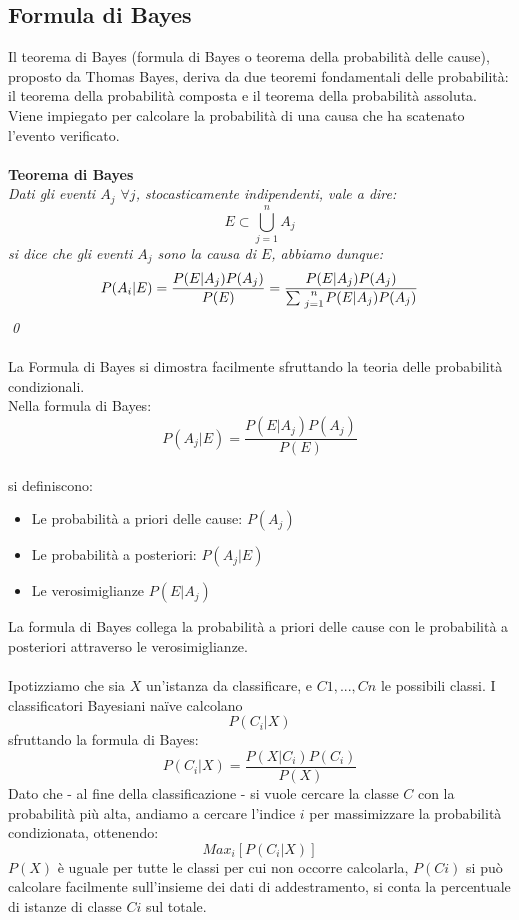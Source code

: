 \documentclass{article}
\theoremstyle{plain}
\theoremstyle{definition}
\begin{document}
\subsection{Formula di Bayes}
Il teorema di Bayes (formula di Bayes o teorema della probabilità delle cause), proposto da Thomas Bayes, deriva da due teoremi fondamentali delle probabilità: il teorema della probabilità composta e il teorema della probabilità assoluta. Viene impiegato per calcolare la probabilità di una causa che ha scatenato l'evento verificato.
\\
\\
\textbf{Teorema di Bayes}
\\
\textit{
Dati gli eventi $A_j$ $\forall j$, stocasticamente indipendenti, vale a dire:
$$E \subset \bigcup\limits_{j=1}^{n} A_j $$
si dice che gli eventi $A_j$ sono la causa di $E$,  abbiamo dunque:
$$
P(A_{i}|E)={\frac  {P(E|A_{j})P(A_{j})}{P(E)}}={\frac  {P(E|A_{j})P(A_{j})}{\sum {n \atop j=1}P(E|A_{j})P(A_{j})}}$$
\qed
}
\\
\\
La Formula di Bayes si dimostra facilmente sfruttando la teoria delle probabilità condizionali. 
\footnotemark
{}
\\
Nella formula di Bayes:
$$P(A_{j}|E)={\frac  {P(E|A_{j})P(A_{j})}{P(E)}}$$
\\
si definiscono:
\begin{itemize}
\item Le probabilità a priori delle cause: $P(A_j)$
\item Le probabilità a posteriori: $P(A_j|E)$
\item Le verosimiglianze $P(E|A_{j})$
\end{itemize} 
La formula di Bayes collega la probabilità a priori delle cause con le probabilità a posteriori attraverso le verosimiglianze.
\\
\\
Ipotizziamo che sia $X$ un'istanza da classificare, e $C1,...,Cn$ le possibili classi. I classificatori Bayesiani naïve calcolano $$P(C_i|X)$$ sfruttando la formula di Bayes: $$P(C_i|X)=\frac{P(X|C_i)P(C_i)}{P(X)}$$
Dato che - al fine della classificazione - si vuole cercare la classe $C$ con la probabilità più alta, andiamo a cercare l'indice $i$ per massimizzare la probabilità condizionata, ottenendo: 
$$Max_i [P(C_i|X)]$$
$P(X)$ è uguale per tutte le classi per cui non occorre calcolarla, $P(Ci)$ si può calcolare facilmente sull'insieme dei dati di addestramento, si conta la percentuale di istanze di classe $Ci$ sul totale.
\end{document}
